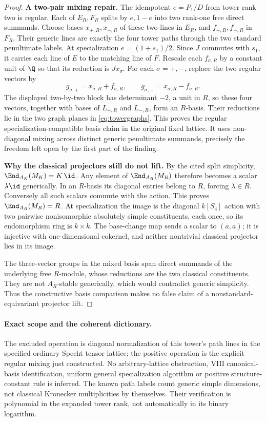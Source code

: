 \begin{proof}
\par\smallskip\noindent\textbf{A two-pair mixing repair.}\quad
The idempotent $e=P_1/D$ from tower rank two is regular. Each of $E_R,F_R$
splits by $e,1-e$ into two rank-one free direct summands. Choose
bases $x_{+,R},x_{-,R}$ of these two lines in $E_R$, and
$f_{+,R},f_{-,R}$ in $F_R$. Their generic lines are exactly the
four tower paths through the two standard penultimate labels.
At specialization $e=(1+s_1)/2$. Since $J$ commutes with $s_1$,
it carries each line of $E$ to the matching line of $F$. Rescale
each $f_{\sigma,R}$ by a constant unit of $\Q$ so that its
reduction is $Jx_\sigma$.
For each $\sigma=+,-$, replace the two regular vectors by
\[
 g_{\sigma,+}=x_{\sigma,R}+f_{\sigma,R},\qquad
 g_{\sigma,-}=x_{\sigma,R}-f_{\sigma,R}.
\]
The displayed two-by-two block has determinant $-2$, a unit in
$R$, so these four vectors, together with bases of $L_{+,R}$
and $L_{-,R}$, form an $R$-basis. Their reductions lie in the
two graph planes in \eqref{eq:towergraphs}. This proves the
regular specialization-compatible basis claim in the original
fixed lattice. It uses non-diagonal mixing across distinct generic
penultimate summands, precisely the freedom left open by the first
part of the finding.

\par\smallskip\noindent\textbf{Why the classical projectors still do not lift.}\quad
By the cited split simplicity,
$\End_{A_K}(M_K)=K\,\id$. Any element of $\End_{A_R}(M_R)$
therefore becomes a scalar $\lambda\id$ generically. In an
$R$-basis its diagonal entries belong to $R$, forcing $\lambda\in R$.
Conversely all such scalars commute with the action. This proves
$\End_{A_R}(M_R)=R$. At specialization the image is the diagonal
$k[S_4]$ action with two pairwise nonisomorphic absolutely simple
constituents, each once, so its endomorphism ring is $k\times k$.
The base-change map sends a scalar to $(a,a)$; it is injective with
one-dimensional cokernel, and neither nontrivial classical projector
lies in its image.

The three-vector groups in the mixed basis span direct summands of
the underlying free $R$-module, whose reductions are the two
classical constituents. They are not $A_R$-stable generically,
which would contradict generic simplicity. Thus the constructive
basis comparison makes no false claim of a nonstandard-equivariant
projector lift.
\end{proof}

\paragraph{Exact scope and the coherent dictionary.}
The excluded operation is diagonal normalization of this tower's
path lines in the specified ordinary Specht tensor lattice; the
positive operation is the explicit regular mixing just constructed.
No arbitrary-lattice obstruction, VIII canonical-basis identification,
uniform general specialization algorithm or positive structure-constant
rule is inferred. The known path labels count generic simple dimensions,
not classical Kronecker multiplicities by themselves. Their verification
is polynomial in the expanded tower rank, not automatically in its
binary logarithm.

